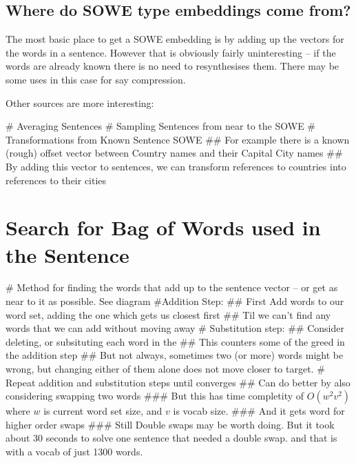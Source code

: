 \documentclass[]{scrartcl}
\numberwithin{equation}{section}
\numberwithin{figure}{section}
\theoremstyle{plain}
\theoremstyle{definition}
\begin{document}
\appendix 
\subsection{Where do SOWE type embeddings come from?}
The most basic place to get a SOWE embedding is by adding up the vectors for the words in a sentence.
However that is obviously fairly uninteresting -- if the words are already known there is no need to resynthesises them. There may be some uses in this case for say compression.

Other sources are more interesting:

\begin{easylist}[itemize]
	# Averaging Sentences
	# Sampling Sentences from near to the SOWE
	# Transformations from Known Sentence SOWE
	## For example there is a known (rough) offset vector between Country names and their Capital City names
	## By adding this vector to sentences, we can transform references to countries into references to their cities
\end{easylist}


\section{Search for Bag of Words used in the Sentence}



\begin{easylist}[itemize]
	# Method for finding the words that add up to the sentence vector -- or get as near to it as possible. See diagram
	#Addition Step:
	## First Add words to our word set, adding the one which gets us closest first
	## Til we can't find any words that we can add without moving away
	# Substitution step:
	## Consider deleting, or subsituting each word in the
	## This counters some of the greed in the addition step
	## But not always, sometimes two (or more) words might be wrong, but changing either of them alone does not move closer to target.
	# Repeat addition and substitution steps until converges
	## Can do better by also considering swapping two words
	### But this has time completity of $O(w^2 v^2)$ where $w$ is current word set size, and $v$ is vocab size.
	### And it gets word for higher order swaps
	### Still Double swaps may be worth doing. But it took about 30 seconds to solve one sentence that needed a double swap. and that is with a vocab of just 1300 words.
\end{easylist}
\end{document}
